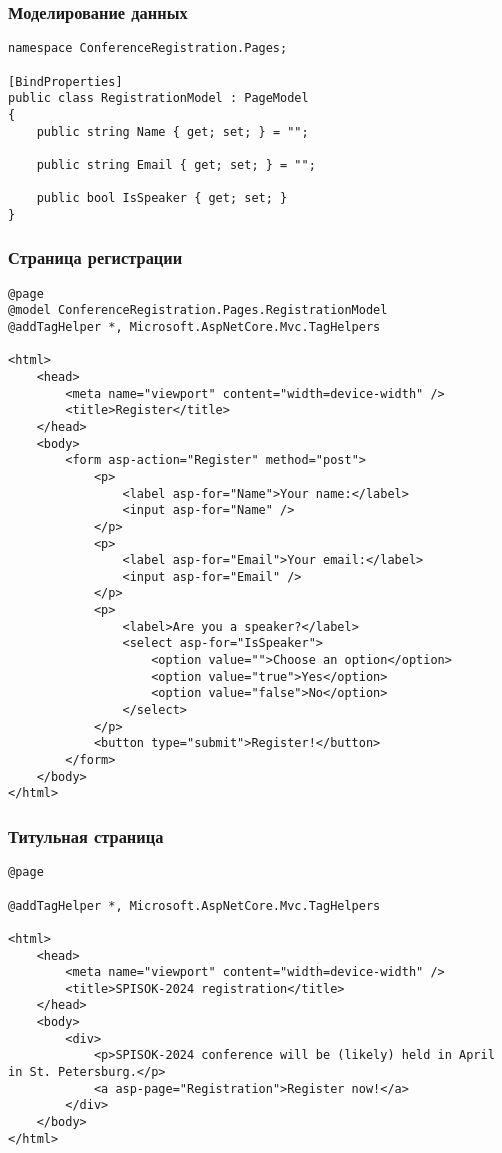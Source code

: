 \documentclass{../../slides-style}
\begin{document}
    \begin{frame}[fragile]
        \frametitle{Моделирование данных}
        \begin{verbatim}
namespace ConferenceRegistration.Pages;

[BindProperties]
public class RegistrationModel : PageModel
{
    public string Name { get; set; } = "";

    public string Email { get; set; } = "";

    public bool IsSpeaker { get; set; }
}
        \end{verbatim}
    \end{frame}

    \begin{frame}[fragile]
        \frametitle{Страница регистрации}
        \begin{ssmall}
            \begin{verbatim}
@page
@model ConferenceRegistration.Pages.RegistrationModel
@addTagHelper *, Microsoft.AspNetCore.Mvc.TagHelpers

<html>
    <head>
        <meta name="viewport" content="width=device-width" />
        <title>Register</title>
    </head>
    <body>
        <form asp-action="Register" method="post">
            <p>
                <label asp-for="Name">Your name:</label>
                <input asp-for="Name" />
            </p>
            <p>
                <label asp-for="Email">Your email:</label>
                <input asp-for="Email" />
            </p>
            <p>
                <label>Are you a speaker?</label>
                <select asp-for="IsSpeaker">
                    <option value="">Choose an option</option>
                    <option value="true">Yes</option>
                    <option value="false">No</option>
                </select>
            </p>
            <button type="submit">Register!</button>
        </form>
    </body>
</html>
            \end{verbatim}
        \end{ssmall}
    \end{frame}

    \begin{frame}[fragile]
        \frametitle{Титульная страница}
        \begin{footnotesize}
            \begin{verbatim}
@page

@addTagHelper *, Microsoft.AspNetCore.Mvc.TagHelpers

<html>
    <head>
        <meta name="viewport" content="width=device-width" />
        <title>SPISOK-2024 registration</title>
    </head>
    <body>
        <div>
            <p>SPISOK-2024 conference will be (likely) held in April in St. Petersburg.</p>
            <a asp-page="Registration">Register now!</a>
        </div>
    </body>
</html>
            \end{verbatim}
        \end{footnotesize}
    \end{frame}
\end{document}
